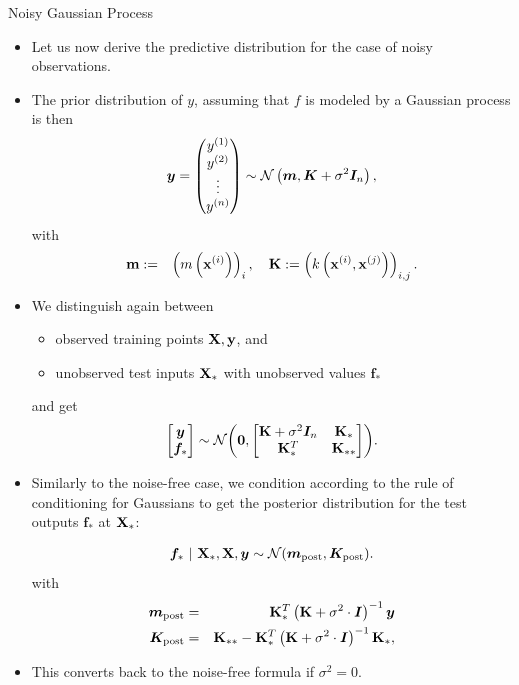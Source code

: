 \begin{vbframe}{Noisy Gaussian Process}
\framebreak 

\begin{itemize}
  \item Let us now derive the predictive distribution for the case of noisy observations. 
  \item The prior distribution of $y$, assuming that $f$ is modeled by a Gaussian process is then
  $$
    \bm{y} = \begin{pmatrix} \yi[1] \\ \yi[2] \\ \vdots \\ \yi[n] \end{pmatrix} \sim \mathcal{N}\left(\bm{m}, \bm{K} + \sigma^2 \bm{I}_n \right),
  $$
  with 
  \begin{eqnarray*}
    \textbf{m} &:=& \left(m\left(\xi\right)\right)_{i}, \quad
    \textbf{K} := \left(k\left(\xi, \xv^{(j)}\right)\right)_{i,j}. 
  \end{eqnarray*}

  \framebreak 
  
  \item We distinguish again between 
  \begin{itemize}
    \item observed training points $\Xmat, \yv$, and 
    \item unobserved test inputs $\Xmat_*$ with unobserved values $\bm{f}_*$
  \end{itemize} 
  and get
  $$
  \begin{bmatrix}
  \bm{y} \\
  \bm{f}_*
  \end{bmatrix} \sim  
    \mathcal{N}\biggl(\bm{0}, \begin{bmatrix} \Kmat + \sigma^2 \bm{I}_n & \Kmat_* \\ \Kmat_*^T & \Kmat_{**} \end{bmatrix}\biggr).
  $$

\framebreak

  \item Similarly to the noise-free case, we condition according to the rule of conditioning for Gaussians to get the posterior distribution for the test outputs $\bm{f}_*$ at $\Xmat_*$: 

  \begin{eqnarray*}
    \bm{f}_* ~|~ \Xmat_*, \Xmat, \bm{y} \sim \mathcal{N}(\bm{m}_{\text{post}}, \bm{K}_\text{post}).
\end{eqnarray*}
  with 
  \begin{eqnarray*}
    \bm{m}_{\text{post}} &=& \Kmat_{*}^{T} \left(\Kmat+ \sigma^2 \cdot \id\right)^{-1}\bm{y} \\
    \bm{K}_\text{post} &=& \Kmat_{**} - \Kmat_*^T \left(\Kmat  + \sigma^2 \cdot \id\right)^{-1}\Kmat_*,
  \end{eqnarray*}
\item This converts back to the noise-free formula if $\sigma^2 = 0$.


\end{itemize}
\end{vbframe}
